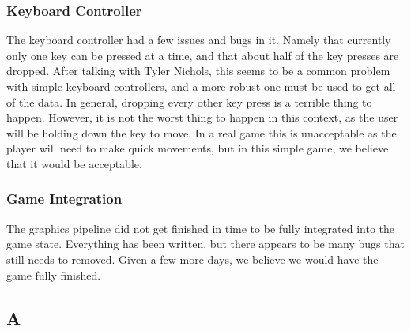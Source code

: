 \documentclass[onecolumn]{IEEEtran}
\begin{document}
\subsection{Keyboard Controller}
The keyboard controller had a few issues and bugs in it.  Namely that currently only one key can be pressed at a time, and that about half of the key presses are dropped.  After talking with Tyler Nichols, this seems to be a common problem with simple keyboard controllers, and a more robust one must be used to get all of the data.  In general, dropping every other key press is a terrible thing to happen.  However, it is not the worst thing to happen in this context, as the user will be holding down the key to move.  In a real game this is unacceptable as the player will need to make quick movements, but in this simple game, we believe that it would be acceptable.

\subsection{Game Integration}
The graphics pipeline did not get finished in time to be fully integrated into the game state.  Everything has been written, but there appears to be many bugs that still needs to removed.  Given a few more days, we believe we would have the game fully finished.




\appendix
\begin{center}
\chapter{A}
\end{center}

%

\end{document}
